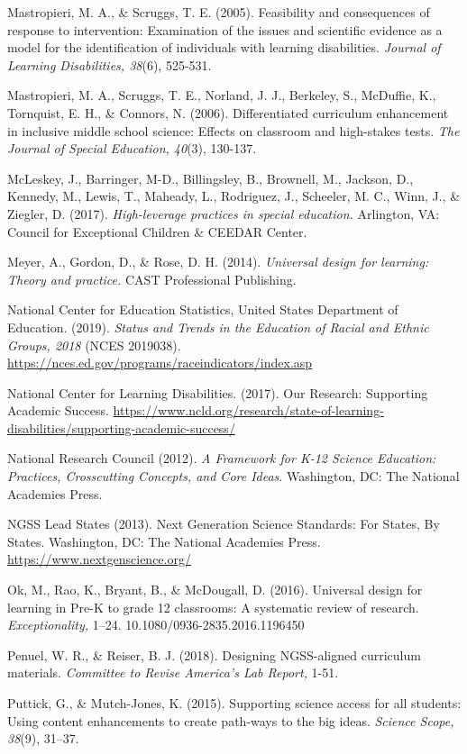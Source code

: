 \documentclass[11.5pt]{sig-alternate}
\begin{document}
Mastropieri, M. A., \& Scruggs, T. E. (2005). Feasibility and consequences of response to intervention: Examination of the issues and scientific evidence as a model for the identification of individuals with learning disabilities. \textit{Journal of Learning Disabilities, 38}(6), 525-531.

Mastropieri, M. A., Scruggs, T. E., Norland, J. J., Berkeley, S., McDuffie, K., Tornquist, E. H., \& Connors, N. (2006). Differentiated curriculum enhancement in inclusive middle school science: Effects on classroom and high-stakes tests. \textit{The Journal of Special Education, 40}(3), 130-137.

McLeskey, J., Barringer, M-D., Billingsley, B., Brownell, M., Jackson, D., Kennedy, M., Lewis, T., Maheady, L., Rodriguez, J., Scheeler, M. C., Winn, J., \& Ziegler, D. (2017). \textit{High-leverage practices in special education.} Arlington, VA: Council for Exceptional Children \& CEEDAR Center.

Meyer, A., Gordon, D., \& Rose, D. H. (2014). \textit{Universal design for learning: Theory and practice.} CAST Professional Publishing.

National Center for Education Statistics, United States Department of Education. (2019). \textit{Status and Trends in the Education of Racial and Ethnic Groups, 2018} (NCES 2019038). \url{https://nces.ed.gov/programs/raceindicators/index.asp}

National Center for Learning Disabilities. (2017). Our Research: Supporting Academic Success. \url{https://www.ncld.org/research/state-of-learning-disabilities/supporting-academic-success/}

National Research Council (2012). \textit{A Framework for K-12 Science Education: Practices, Crosscutting Concepts, and Core Ideas}. Washington, DC: The National Academies Press. 

NGSS Lead States (2013). Next Generation Science Standards: For States, By States. Washington, DC: The National Academies Press. \url{https://www.nextgenscience.org/ }

Ok, M., Rao, K., Bryant, B., \& McDougall, D. (2016). Universal design for learning in Pre-K to grade 12 classrooms: A systematic review of research. \textit{Exceptionality,} 1–24. 10.1080/0936-2835.2016.1196450 

Penuel, W. R., \& Reiser, B. J. (2018). Designing NGSS-aligned curriculum materials. \textit{Committee to Revise America’s Lab Report,} 1-51.

Puttick, G., \& Mutch-Jones, K. (2015). Supporting science access for all students: Using content enhancements to create path-ways to the big ideas. \textit{Science Scope, 38}(9), 31–37.
\end{document}

